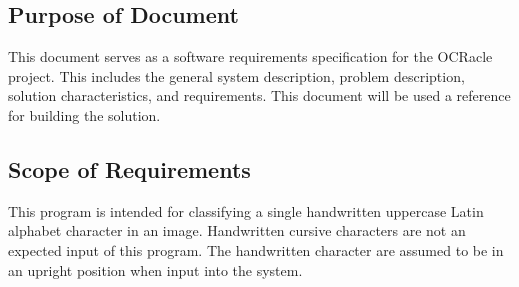 \documentclass[12pt]{article}
\begin{document}
\subsection{Purpose of Document}

This document serves as a software requirements specification for the OCRacle
project. This includes the general system description, problem description,
solution characteristics, and requirements. This document will be used a
reference for building the solution.


\subsection{Scope of Requirements} 

This program is intended for classifying a single handwritten uppercase Latin
alphabet character in an image. Handwritten cursive characters are not an
expected input of this program. The handwritten character are assumed to be in
an upright position when input into the system.


\end{document}
